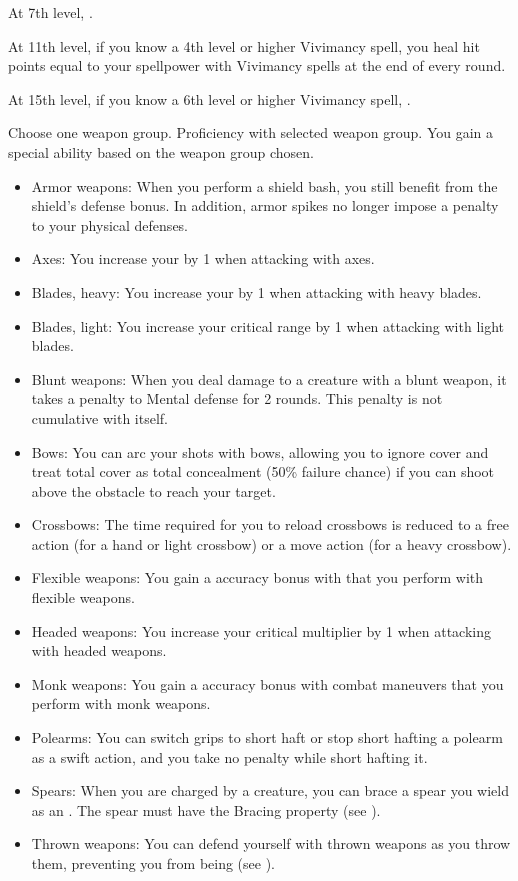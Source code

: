    At 7th level, \tdash.

    At 11th level, if you know a 4th level or higher Vivimancy spell, you heal hit points equal to your spellpower with Vivimancy spells at the end of every round.

    At 15th level, if you know a 6th level or higher Vivimancy spell, \tdash.

    Choose one weapon group.
    \featpre Proficiency with selected weapon group.
    \featben You gain a special ability based on the weapon group chosen.
    \begin{itemize}
        \item Armor weapons: When you perform a shield bash, you still benefit from the shield's defense bonus.
            In addition, armor spikes no longer impose a penalty to your physical defenses.
        \item Axes: You increase your  by 1 when attacking with axes.
        \item Blades, heavy: You increase your  by 1 when attacking with heavy blades.
        \item Blades, light: You increase your critical range by 1 when attacking with light blades.
        \item Blunt weapons: When you deal damage to a creature with a blunt weapon, it takes a  penalty to Mental defense for 2 rounds.
            This penalty is not cumulative with itself.
        \item Bows: You can arc your shots with bows, allowing you to ignore cover and treat total cover as total concealment (50\% failure chance) if you can shoot above the obstacle to reach your target.
        \item Crossbows: The time required for you to reload crossbows is reduced to a free action (for a hand or light crossbow) or a move action (for a heavy crossbow).
        \item Flexible weapons: You gain a  accuracy bonus with  that you perform with flexible weapons.
        \item Headed weapons: You increase your critical multiplier by 1 when attacking with headed weapons.
        \item Monk weapons: You gain a  accuracy bonus with combat maneuvers that you perform with monk weapons.
        \item Polearms: You can switch grips to short haft or stop short hafting a polearm as a swift action, and you take no penalty while short hafting it.
        \item Spears: When you are charged by a creature, you can brace a spear you wield as an . The spear must have the Bracing property (see ).
        \item Thrown weapons: You can defend yourself with thrown weapons as you throw them, preventing you from being  (see ).
    \end{itemize}

